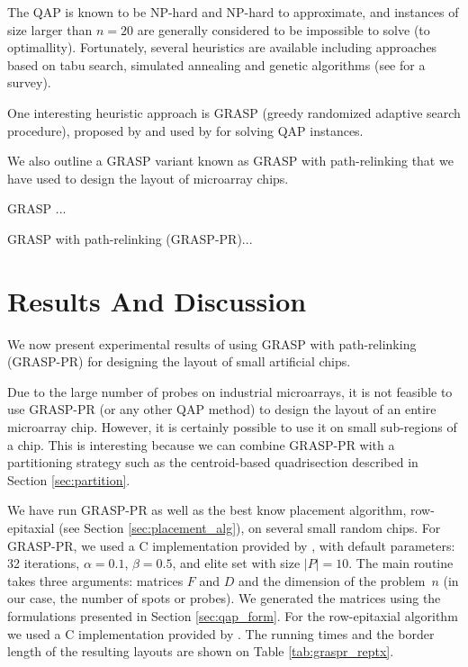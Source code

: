 \documentclass{bioinfo}
\begin{document}
The QAP is known to be NP-hard and NP-hard to approximate, and instances of size larger than $n = 20$ are generally considered to be impossible to solve (to optimallity). Fortunately, several heuristics are available including approaches based on tabu search, simulated annealing and genetic algorithms (see \citealp{CELA98} for a survey).

One interesting heuristic approach is GRASP (greedy randomized adaptive search procedure), proposed by \citealp{FEO95} and used by \citealp{LI94} for solving QAP instances.

We also outline a GRASP variant known as GRASP with path-relinking \citep{OLIVEIRA04} that we have used to design the layout of microarray chips.

GRASP ...

GRASP with path-relinking (GRASP-PR)...

\section{Results And Discussion}
\label{sec:results}

We now present experimental results of using GRASP with path-relinking (GRASP-PR) for designing the layout of small artificial chips.

Due to the large number of probes on industrial microarrays, it is not feasible to use GRASP-PR (or any other QAP method) to design the layout of an entire microarray chip. However, it is certainly possible to use it on small sub-regions of a chip. This is interesting because we can combine GRASP-PR with a partitioning strategy such as the centroid-based quadrisection described in Section \ref{sec:partition}.

We have run GRASP-PR as well as the best know placement algorithm, row-epitaxial (see Section \ref{sec:placement_alg}), on several small random chips. For GRASP-PR, we used a C implementation provided by \citealp{OLIVEIRA04}, with default parameters: 32 iterations, $\alpha=0.1$, $\beta=0.5$, and elite set with size $\mid P\mid = 10$. The main routine takes three arguments: matrices $F$ and $D$ and the dimension of the problem~$n$ (in our case, the number of spots or probes). We generated the matrices using the formulations presented in Section \ref{sec:qap_form}. For the row-epitaxial algorithm we used a C implementation provided by \citealp{KAHNG03A}. The running times and the border length of the resulting layouts are shown on Table \ref{tab:graspr_reptx}.
\end{document}
